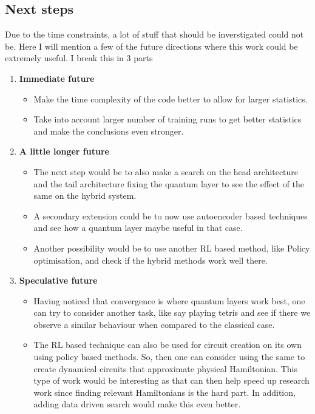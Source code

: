 \documentclass{article}
\begin{document}
\subsection{Next steps}
Due to the time constraints, a lot of stuff that should be inverstigated could not be. Here I will mention a few of the future directions where this work could be extremely useful. I break this in 3 parts 
\begin{enumerate}
    \item \textbf{Immediate future} 
    \begin{itemize}
        \item Make the time complexity of the code better to allow for larger statistics.
        \item Take into account larger number of training runs to get better statistics and make the conclusions even stronger.
    \end{itemize}
    \item \textbf{A little longer future}
    \begin{itemize}
        \item The next step would be to also make a search on the head architecture and the tail architecture fixing the quantum layer to see the effect of the same on the hybrid system.
        \item A secondary extension could be to now use autoencoder based techniques and see how a quantum layer maybe useful in that case.
        \item Another possibility would be to use another RL based method, like Policy optimisation, and check if the hybrid methods work well there.
    \end{itemize} 
    \item \textbf{Speculative future}
    \begin{itemize}
        \item Having noticed that convergence is where quantum layers work best, one can try to consider another task, like say playing tetris and see if there we observe a similar behaviour when compared to the classical case.
        \item The RL based technique can also be used for circuit creation on its own using policy based methods. So, then one can consider using the same to create dynamical circuits that approximate physical Hamiltonian. This type of work would be interesting as that can then help speed up research work since finding relevant Hamiltonians is the hard part. In addition, adding data driven search would make this even better.
    \end{itemize}
\end{enumerate} 
\end{document}
